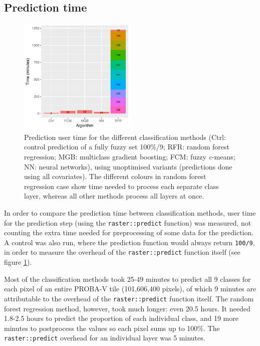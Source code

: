 \documentclass[a4paper,12pt]{scrbook}
\begin{document}
\subsection{Prediction time}

\begin{figure}
  \centering
  \includegraphics[width=0.5\textwidth]{../plot/timing}
  \caption{Prediction user time for the different classification methods (Ctrl: control prediction of a fully fuzzy set 100\%/9; RFR: random forest regression; MGB: multiclass gradient boosting; FCM: fuzzy \textit{c}-means; NN: neural networks), using unoptimised variants (predictions done using all covariates). The different colours in random forest regression case show time needed to process each separate class layer, whereas all other methods process all layers at once.}
  \label{fig-timing}
\end{figure}

In order to compare the prediction time between classification methods, user time for the prediction step (using the \texttt{raster::predict} function) was measured, not counting the extra time needed for preprocessing of some data for the prediction. A control was also run, where the prediction function would always return \texttt{100/9}, in order to measure the overhead of the \texttt{raster::predict} function itself (see figure \ref{fig-timing}).

Most of the classification methods took 25-49 minutes to predict all 9 classes for each pixel of an entire PROBA-V tile (101,606,400 pixels), of which 9 minutes are attributable to the overhead of the \texttt{raster::predict} function itself. The random forest regression method, however, took much longer: even 20.5 hours. It needed 1.8-2.5 hours to predict the proportion of each individual class, and 19 more minutes to postprocess the values so each pixel sums up to 100\%. The \texttt{raster::predict} overhead for an individual layer was 5 minutes.
\end{document}
